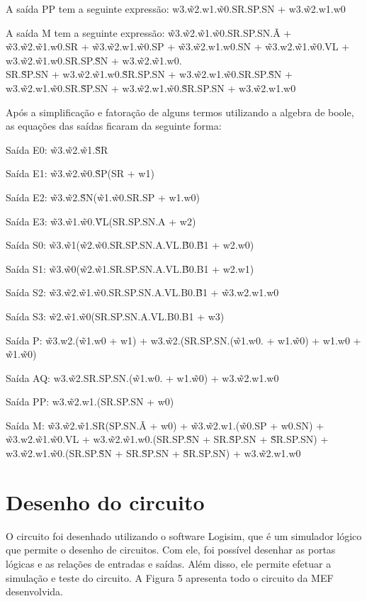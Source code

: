 A saída PP tem a seguinte expressão: w3.\~w2.w1.\~w0.SR.SP.SN + w3.\~w2.w1.w0

A saída M tem a seguinte expressão:	\~w3.\~w2.\~w1.\~w0.SR.SP.SN.\~A + \~w3.\~w2.\~w1.w0.SR + \~w3.\~w2.w1.\~w0.SP + \~w3.\~w2.w1.w0.SN + \~w3.w2.\~w1.\~w0.VL + w3.\~w2.\~w1.w0.SR.SP.\~SN + w3.\~w2.\~w1.w0.\\SR.\~SP.SN + w3.\~w2.\~w1.w0.\~SR.SP.SN + w3.\~w2.w1.\~w0.SR.SP.\~SN + w3.\~w2.w1.\~w0.SR.\~SP.SN + w3.\~w2.w1.\~w0.\~SR.SP.SN + w3.\~w2.w1.w0			

Após a simplificação e fatoração de alguns termos utilizando a algebra de boole, as equações das saídas ficaram da seguinte forma:

Saída E0: \~w3.\~w2.\~w1.\~SR

Saída E1: \~w3.\~w2.\~w0.\~SP(SR + w1)

Saída E2: \~w3.\~w2.\~SN(\~w1.\~w0.SR.SP + w1.w0)

Saída E3: \~w3.\~w1.\~w0.\~VL(SR.SP.SN.A + w2)

Saída S0: \~w3.\~w1(\~w2.\~w0.SR.SP.SN.A.VL.\~B0.\~B1 + w2.w0)

Saída S1: \~w3.\~w0(\~w2.\~w1.SR.SP.SN.A.VL.\~B0.B1 + w2.w1)

Saída S2: \~w3.\~w2.\~w1.\~w0.SR.SP.SN.A.VL.B0.\~B1 + \~w3.w2.w1.w0

Saída S3: \~w2.\~w1.\~w0(SR.SP.SN.A.VL.B0.B1 + w3)

Saída P: \~w3.w2.(\~w1.w0 + w1) + w3.\~w2.(SR.SP.SN.(\~w1.w0. + w1.\~w0) + w1.w0 + \~w1.\~w0)

Saída AQ: w3.\~w2.SR.SP.SN.(\~w1.w0. + w1.\~w0) + w3.\~w2.w1.w0 

Saída PP: w3.\~w2.w1.(SR.SP.SN + w0)

Saída M: \~w3.\~w2.\~w1.SR(SP.SN.\~A + w0) + \~w3.\~w2.w1.(\~w0.SP + w0.SN) + \~w3.w2.\~w1.\~w0.VL + w3.\~w2.\~w1.w0.(SR.SP.\~SN + SR.\~SP.SN + \~SR.SP.SN) + w3.\~w2.w1.\~w0.(SR.SP.\~SN + SR.\~SP.SN + \~SR.SP.SN) + w3.\~w2.w1.w0

\section{Desenho do circuito}

O circuito foi desenhado utilizando o software Logisim, que é um simulador lógico que permite o desenho de circuitos. Com ele, foi possível desenhar as portas lógicas e as relações de entradas e saídas. Além disso, ele permite efetuar a simulação e teste do circuito. A Figura 5 apresenta todo o circuito da MEF desenvolvida.


